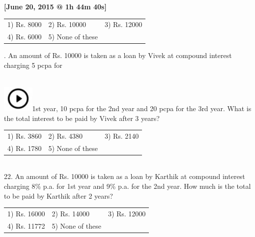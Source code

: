 \documentclass{article}
\begin{document}
	\noindent 
	
	\noindent \textbf{[June 20, 2015 @ 1h 44m 40s]}
	
	\noindent 
	
	\noindent \begin{tabular}{p{1.7in} p{1.6in} p{1.6in}} \\ 
 1) Rs. 8000                 &  2) Rs. 10000        &  3) Rs. 12000        \\
4) Rs. 6000          & 5) None of these  \\
\end{tabular}
	
	\noindent 
	
	\noindent 
	
	\noindent 
\newpage
	.  An amount of Rs. 10000 is taken as a loan by Vivek at compound interest charging 5 pcpa for
	
	\noindent  
\noindent \\ \includegraphics*[width=0.60in, height=0.52in]{images/image1}1st year,  10 pcpa for the 2nd year and 20 pcpa for the 3rd year. What is the total interest to be paid by Vivek after 3 years?
	
	\noindent 
	
	\noindent \begin{tabular}{p{1.7in} p{1.6in} p{1.6in}} \\ 
 1) Rs. 3860                 &  2) Rs. 4380          &  3) Rs. 2140          \\
4) Rs. 1780          & 5) None of these  \\
\end{tabular}
	
	\noindent 
	
	\noindent 
	
	\noindent 
	
	\noindent \\  22. An amount of Rs. 10000 is taken as a loan by Karthik at compound interest charging 8\% p.a. for 1st year and 9\% p.a. for the 2nd year. How much is the total to be paid by Karthik after 2 years?
	
	\noindent \begin{tabular}{p{1.7in} p{1.6in} p{1.6in}} \\ 
 1) Rs. 16000               &  2) Rs. 14000        &  3) Rs. 12000        \\
4) Rs. 11772        & 5) None of these  \\
\end{tabular}
	
\end{document}
